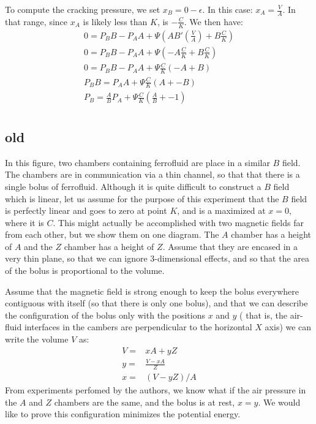 \documentclass{asme2ej}
\begin{document}
To compute the cracking pressure, we set $x_B = 0-\epsilon$.
In this case: $x_A = \frac{V}{A}$. In that range, since $x_A$ is likely
less than $K$, is $-\frac{C}{K}$.
We then have:
\begin{align}
  0 = P_BB - P_AA +  \Psi ( A B'(\frac{V}{A}) + B \frac{C}{K}) \\
  0 = P_BB - P_AA +  \Psi ( -A \frac{C}{K} + B \frac{C}{K}) \\
  0 = P_BB - P_AA +  \Psi \frac{C}{K} ( -A + B)  \\
  P_BB =  P_AA +  \Psi \frac{C}{K} ( A + -B)  \\
  P_B =  \frac{A}{B} P_A +  \Psi \frac{C}{K} ( \frac{A}{B} + -1)  \\
\end{align}




\subsection{old}

In this figure, two chambers containing ferrofluid are place in a similar
$B$ field. The chambers are in communication via a thin channel, so that that
there is a single bolus of ferrofluid. Although it is quite difficult to
construct a $B$ field which is linear, let us assume for the purpose of this
experiment that the $B$ field is perfectly linear and goes to zero at
point $K$, and is a maximized at $x=0$, where it is $C$. This might actually
be accomplished with two magnetic fields far from each other, but we show
them on one diagram. The $A$ chamber has a height of $A$ and the $Z$ chamber
has a height of $Z$. Assume that they are encased in a very thin plane, so
that we can ignore 3-dimensional effects, and so that the area of the bolus
is proportional to the volume.

Assume that the magnetic field is strong enough to keep the bolus everywhere
contiguous with itself (so that there is only one bolus), and that we can
describe the configuration of the bolus only with the positions $x$ and $y$ (
that is, the air-fluid interfaces in the cambers are perpendicular to the horizontal $X$ axis)
we can write the
volume $V$ as:
\begin{align}
  V = & xA + yZ \\
  y = & \frac{V - xA}{Z} \\
  x = & (V - y Z)/A
  \label{eqn:yvalue}
\end{align}
From experiments perfomed by the authors, we know what if the air pressure in
the $A$ and $Z$ chambers are the same, and the bolus is at rest, $x = y$.
We would like to prove this configuration minimizes the potential energy.
\end{document}
